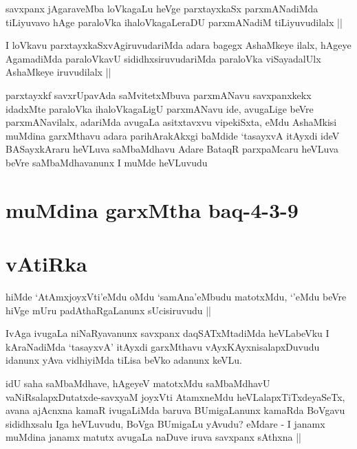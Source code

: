 \begin{artha}
savxpanx jAgaraveMba loVkagaLu heVge parxtayxkaSx parxmANadiMda tiLiyuvavo hAge paraloVka ihaloVkagaLeraDU parxmANadiM tiLiyuvudilalx ||
\end{artha}


\begin{artha}
I loVkavu parxtayxkaSxvAgiruvudariMda adara bagegx AshaMkeye ilalx, hAgeye AgamadiMda paraloVkavU sididhxsiruvudariMda paraloVka viSayadalUlx AshaMkeye iruvudilalx ||
\end{artha}


\begin{artha}
parxtayxkf savxrUpavAda saMvitetxMbuva parxmANavu savxpanxkekx idadxMte paraloVka ihaloVkagaLigU parxmANavu ide, avugaLige beVre parxmANavilalx, adariMda avugaLa asitxtavxvu vipekiSxta, eMdu AshaMkisi muMdina garxMthavu adara parihArakAkxgi baMdide `tasayxvA itAyxdi ideV BASayxkAraru heVLuva saMbaMdhavu Adare BataqR parxpaMcaru heVLuva beVre saMbaMdhavanunx I muMde heVLuvudu
\end{artha}

\section*{muMdina garxMtha baq-4-3-9}

\section*{vAtiRka}


\begin{artha}
hiMde `AtAmxjoyxVti'eMdu oMdu `samAna'eMbudu matotxMdu, `\stext'eMdu beVre hiVge mUru padAthaRgaLanunx sUcisiruvudu ||
\end{artha}

\begin{artha}
IvAga ivugaLa niNaRyavanunx savxpanx daqSATxMtadiMda heVLabeVku I kAraNadiMda `tasayxvA' itAyxdi garxMthavu vAyxKAyxnisalapxDuvudu idanunx yAva vidhiyiMda tiLisa beVko adanunx keVLu.
\end{artha}

\begin{artha}
idU saha saMbaMdhave, hAgeyeV matotxMdu saMbaMdhavU vaNiRsalapxDutatxde-savxyaM joyxVti AtamxneMdu heVLalapxTiTxdeyaSeTx, avana ajAcnxna kamaR ivugaLiMda baruva BUmigaLanunx kamaRda BoVgavu sididhxsalu Iga heVLuvudu, BoVga BUmigaLu yAvudu? eMdare - I janamx muMdina janamx matutx avugaLa naDuve iruva savxpanx sAthxna ||
\end{artha}

